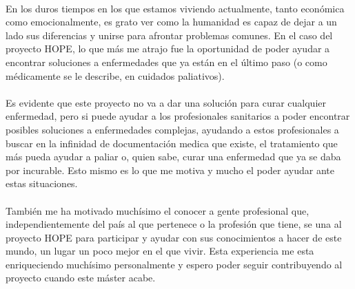 \paragraph{}
En los duros tiempos en los que estamos viviendo actualmente, tanto económica como emocionalmente, es grato ver como la humanidad es capaz de dejar a un lado sus diferencias y unirse para afrontar problemas comunes. En el caso del proyecto HOPE, lo que más me atrajo fue la oportunidad de poder ayudar a encontrar soluciones a enfermedades que ya están en el último paso (o como médicamente se le describe, en cuidados paliativos).

\paragraph{}
Es evidente que este proyecto no va a dar una solución para curar cualquier enfermedad, pero si puede ayudar a los profesionales sanitarios a poder encontrar posibles soluciones a enfermedades complejas, ayudando a estos profesionales a buscar en la infinidad de documentación medica que existe, el tratamiento que más pueda ayudar a paliar o, quien sabe, curar una enfermedad que ya se daba por incurable. Esto mismo es lo que me motiva y mucho el poder ayudar ante estas situaciones.

\paragraph{}
También me ha motivado muchísimo el conocer a gente profesional que, independientemente del país al que pertenece o la profesión que tiene, se una al proyecto HOPE para participar y ayudar con sus conocimientos a hacer de este mundo, un lugar un poco mejor en el que vivir. Esta experiencia me esta enriqueciendo muchísimo personalmente y espero poder seguir contribuyendo al proyecto cuando este máster acabe.

